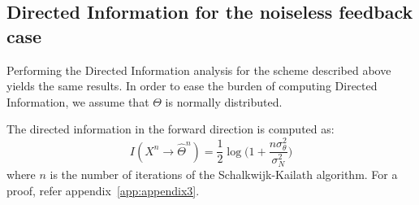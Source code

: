 \documentclass[conference]{IEEEtran}
\begin{document}
\subsection{Directed Information for the noiseless feedback case}

Performing the Directed Information analysis for the scheme described above yields the same results. In order to ease the burden of computing Directed Information, we assume that $\Theta$ is normally distributed.

The directed information in the forward direction is computed as:
\begin{equation*}
	I(X^{n} \rightarrow \widehat{\Theta}^{n}) = \frac{1}{2}\log \bigg( 1+\frac{n\sigma_{\theta}^{2}}{\sigma_{N}^{2}} \bigg)
\end{equation*}
where $n$ is the number of iterations of the Schalkwijk-Kailath algorithm. For a proof, refer appendix~\ref{app:appendix3}.
\end{document}
